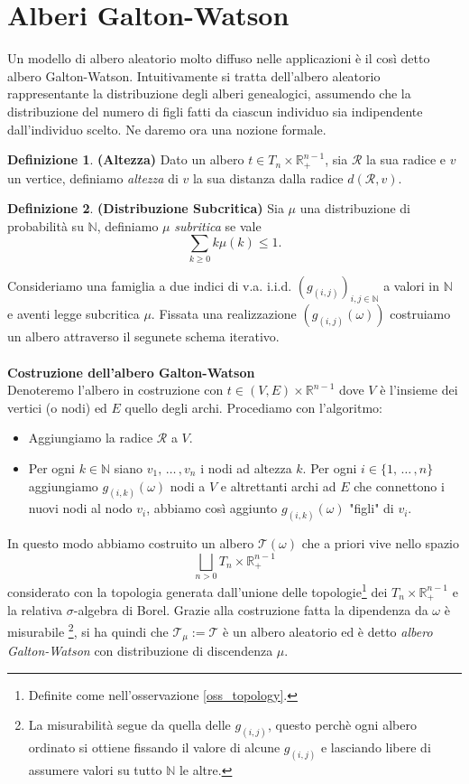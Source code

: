 \documentclass[11pt, twoside]{report}
\newcommand{\Tt}{\mathscr{T}}
\theoremstyle{definition}
\newtheorem{definizione}{Definizione}[chapter]
\theoremstyle{plain}
\theoremstyle{remark}
\numberwithin{equation}{chapter}
\begin{document}
\section{Alberi Galton-Watson}
Un modello di albero aleatorio molto diffuso nelle applicazioni è il così detto albero Galton-Watson. Intuitivamente si tratta dell'albero aleatorio rappresentante la distribuzione degli alberi genealogici, assumendo che la distribuzione del numero di figli fatti da ciascun individuo sia indipendente dall'individuo scelto. Ne daremo ora una nozione formale.

\begin{definizione}{\textbf{(Altezza)}}
Dato un albero $t\in T_n \times \mathbb{R}_+^{n-1}$, sia $\mathcal{R}$ la sua radice e $v$ un vertice, definiamo \textit{altezza} di $v$ la sua distanza dalla radice $d(\mathcal{R}, v)$.
\end{definizione}

\begin{definizione}{\textbf{(Distribuzione Subcritica)}}
Sia $\mu$ una distribuzione di probabilità su $\mathbb{N}$, definiamo $\mu$ \textit{subritica} se vale
$$\sum\limits_{k\geq 0} k \mu(k) \leq 1.$$ 
\end{definizione}

Consideriamo una famiglia a due indici di v.a. i.i.d. $(g_{(i,j)})_{i,j\in\mathbb{N}}$ a valori in $\mathbb{N}$ e aventi legge subcritica $\mu$. Fissata una realizzazione $(g_{(i,j)}(\omega))$ costruiamo un albero attraverso il segunete schema iterativo. \\
\\
\textbf{Costruzione dell'albero Galton-Watson}\\
Denoteremo l'albero in costruzione con $t\in(V,E) \times \mathbb{R}^{n-1}$ dove $V$ è l'insieme dei vertici (o nodi) ed $E$ quello degli archi. Procediamo con l'algoritmo:
\begin{itemize}
\item Aggiungiamo la radice $\mathcal{R}$ a $V$.

\item Per ogni $k\in\mathbb{N}$ siano $v_1, \, \dots \, ,v_n$ i nodi ad altezza $k$. Per ogni $i\in \{1, \, \dots \, ,n\}$ aggiungiamo $g_{(i,k)}(\omega)$ nodi a $V$ e altrettanti archi ad $E$ che connettono i nuovi nodi al nodo $v_i$, abbiamo così aggiunto $g_{(i,k)}(\omega)$ "figli" di $v_i$.
\end{itemize}

In questo modo abbiamo costruito un albero $\Tt(\omega)$ che a priori vive nello spazio 
$${\bigsqcup_{n>0} T_n \times \mathbb{R}_+^{n-1}}$$ considerato con la topologia generata dall'unione delle topologie\footnote{Definite come nell'osservazione \ref{oss_topology}.} dei $T_n \times \mathbb{R}_+^{n-1}$ e la relativa $\sigma$-algebra di Borel. Grazie alla costruzione fatta la dipendenza da $\omega$ è misurabile \footnote{La misurabilità segue da quella delle $g_{(i,j)}$, questo perchè ogni albero ordinato si ottiene fissando il valore di alcune $g_{(i,j)}$ e lasciando libere di assumere valori su tutto $\mathbb{N}$ le altre.}, si ha quindi che $\Tt_{\mu}:=\Tt$ è un albero aleatorio ed è detto \textit{albero Galton-Watson} con distribuzione di discendenza $\mu$. 
\end{document}
